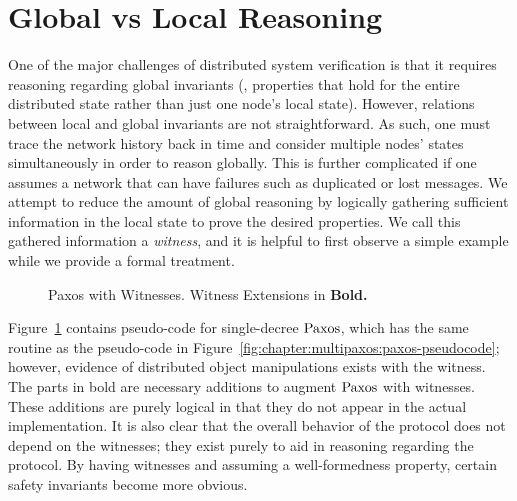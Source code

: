 \section{Global vs Local Reasoning}
\label{chapter:witnesspassing:sec:global-local-reasoning}


One of the major challenges of distributed system verification is that it requires reasoning regarding global invariants 
 (\ie, properties that hold for the entire distributed state rather than just
one node's local state).
However, relations between local and global invariants are not straightforward. 
As such, one must trace the network history back in time and consider multiple nodes’ states simultaneously in order to reason globally. 
This is further complicated if one assumes a network that can have failures such as duplicated or lost messages. 
We attempt to reduce the amount of global reasoning by logically gathering sufficient information in the local 
state to prove the desired properties. We call this gathered information a \textit{witness}, and it is helpful to first observe a simple example while we provide a formal treatment. 

\begin{figure}
\begin{minipage}{\linewidth}
\noindent
\begin{multicols}{2}
  
\end{multicols}
\end{minipage}
\caption{Paxos with Witnesses. Witness Extensions in \bfseries{Bold}.}
\label{fig:chapter:witnesspassing:paxos-witness}
\end{figure}

Figure~\ref{fig:chapter:witnesspassing:paxos-witness} 
contains pseudo-code for single-decree $\mathrm{Paxos}$, which has the same routine as the pseudo-code in Figure~\ref{fig:chapter:multipaxos:paxos-pseudocode};
 however, evidence of distributed object manipulations exists with the witness.
 The parts in bold are necessary additions to augment $\mathrm{Paxos}$ with witnesses. These additions are purely logical in that they do not appear in the actual implementation. 
 It is also clear that the overall behavior of the protocol does not depend on the witnesses; 
 they exist purely to aid in reasoning regarding the protocol. By having witnesses and assuming a well-formedness property, certain safety invariants become more obvious.
 
